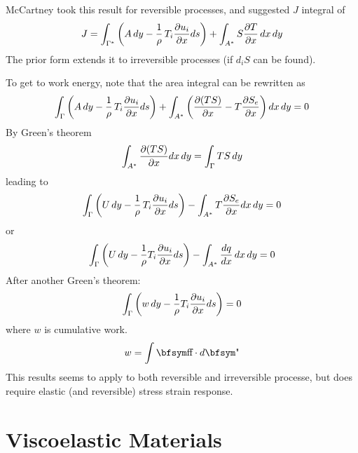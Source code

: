 \documentclass[11pt]{article}
\begin{document}
McCartney took this result for reversible processes, and suggested $J$ integral of
\begin{equation}%
           J = \int_{\Gamma^*} \left(A\thinspace dy
                     - {1\over\rho}\thinspace T_i {\partial u_i\over \partial x} ds\right)
                        + \int_{A^*}  S {\partial T\over\partial x}\thinspace dx \thinspace dy
\end{equation}%
The prior form extends it to irreversible processes (if $d_iS$ can be found).

To get to work energy, note that the area integral can be rewritten as
\begin{equation}%
           \int_\Gamma \left(A\thinspace dy - {1\over\rho}\thinspace T_i {\partial u_i\over \partial x} ds\right)
                        + \int_{A^*}  \left(  {\partial( TS)\over\partial x} - T {\partial S_e\over\partial x} 
                            \right ) dx \thinspace dy = 0
\end{equation}%
By Green's theorem
\begin{equation}%
         \int_{A^*}    {\partial( TS)\over\partial x}  dx \thinspace dy = \int_\Gamma TS\thinspace dy
\end{equation}%
leading to
\begin{equation}%
           \int_\Gamma \left(U\thinspace dy - {1\over\rho}\thinspace T_i {\partial u_i\over \partial x} ds\right)
                        - \int_{A^*}  T {\partial S_e\over\partial x}  dx \thinspace dy = 0
\end{equation}%
or
\begin{equation}%
           \int_\Gamma \left( U\thinspace dy -  {1\over\rho} T_i {\partial u_i\over \partial x} ds\right)
                        - \int_{A^*}  {dq\over dx} \thinspace  dx \thinspace dy = 0
\end{equation}%
After another Green's theorem:
\begin{equation}%
           \int_\Gamma \left( w\thinspace dy -  {1\over\rho} T_i {\partial u_i\over \partial x} ds\right)
                         = 0
\end{equation}%
where $w$ is cumulative work.
\begin{equation}%
     w = \int \st \cdot d\et
 \end{equation}%
This results seems to apply to both reversible and irreversible processe, but does require elastic (and reversible) stress strain response.



\section{Viscoelastic Materials}
\end{document}
